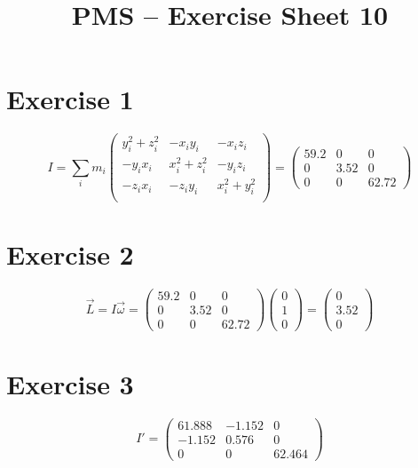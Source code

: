 \documentclass[10pt,DIV10,a4paper]{scrartcl}
\title{PMS -- Exercise Sheet 10}
\date{}
\begin{document}
\maketitle

\section*{Exercise 1}

$$I = \sum_{i} m_{i}
\begin{pmatrix}
    y_i^2+z_i^2 & -x_i y_i    & -x_i z_i \\
   -y_i x_i     & x_i^2+z_i^2 & -y_i z_i \\
   -z_i x_i     & - z_i y_i     &  x_i^2+y_i^2 \\
\end{pmatrix} = \left(\begin{array}{rrr}
59.2& 0 & 0 \\
0 & 3.52 & 0 \\
0 & 0 & 62.72
\end{array}\right)$$

\section*{Exercise 2}

$$\vec{L} = I\vec{\omega} = \left(\begin{array}{rrr}
59.2& 0 & 0 \\
0 & 3.52 & 0 \\
0 & 0 & 62.72
\end{array}\right)
\left(\begin{array}{r}
0\\
1\\
0
\end{array}\right) = \left(\begin{array}{r}
0\\
3.52\\
0
\end{array}\right)
$$

\section*{Exercise 3}

$$I' = \left(\begin{array}{rrr}
61.888 & -1.152 & 0 \\
-1.152 & 0.576 & 0 \\
0 & 0 & 62.464
\end{array}\right)$$
\end{document}
